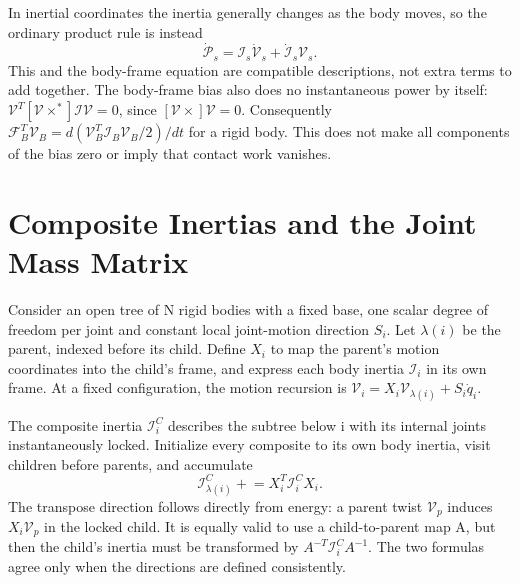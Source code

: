 In inertial coordinates the inertia generally changes as the body moves, so the ordinary product rule is instead
\begin{equation}
\dot{\mathcal P}_s=\mathcal I_s\dot{\mathcal V}_s+\dot{\mathcal I}_s\mathcal V_s.
\label{eq:spatial_momentum_full}
\end{equation}
This and the body-frame equation are compatible descriptions, not extra terms to add together. The body-frame bias also does no instantaneous power by itself: $\mathcal V^T[\mathcal V\times^*]\mathcal I\mathcal V=0$, since $[\mathcal V\times]\mathcal V=0$. Consequently $\mathcal F_B^T\mathcal V_B=d(\mathcal V_B^T\mathcal I_B\mathcal V_B/2)/dt$ for a rigid body. This does not make all components of the bias zero or imply that contact work vanishes.

\section{Composite Inertias and the Joint Mass Matrix}
\label{sec:composite_rigid_body}
\label{alg:alg_crb}

Consider an open tree of N rigid bodies with a fixed base, one scalar degree of freedom per joint and constant local joint-motion direction $S_i$. Let $\lambda(i)$ be the parent, indexed before its child. Define $X_i$ to map the parent's motion coordinates into the child's frame, and express each body inertia $\mathcal I_i$ in its own frame. At a fixed configuration, the motion recursion is $\mathcal V_i=X_i\mathcal V_{\lambda(i)}+S_i\dot q_i$.

The composite inertia $\mathcal I_i^C$ describes the subtree below i with its internal joints instantaneously locked. Initialize every composite to its own body inertia, visit children before parents, and accumulate
\begin{equation}
\mathcal I_{\lambda(i)}^C\mathrel{+}=X_i^T\mathcal I_i^C X_i.
\end{equation}
The transpose direction follows directly from energy: a parent twist $\mathcal V_p$ induces $X_i\mathcal V_p$ in the locked child. It is equally valid to use a child-to-parent map A, but then the child's inertia must be transformed by $A^{-T}\mathcal I_i^C A^{-1}$. The two formulas agree only when the directions are defined consistently.

